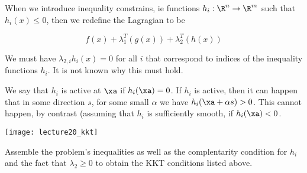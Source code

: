 \documentclass[../main.tex]{subfiles}
\begin{document}
\begin{definition}
    When we introduce inequality constrains, ie functions $h_i: \R^n \to \R^m$ such that $h_i(x) \leq 0$, then we redefine the Lagragian to be

    \[
        f(x) + \lambda_1^T(g(x)) + \lambda_2^T(h(x))
    \]
\end{definition}

\begin{remark}
    We must have $\lambda_{2,i} h_{i}(x) = 0$ for all $i$ that correspond to indices of the inequality functions $h_i$. It is not known why this must hold.

We say that $h_i$ is active at $\xa$ if $h_i(\xa) = 0$. If $h_i$ is active, then it can happen that in some direction $s$, for some small $\alpha$ we have $h_i(\xa + \alpha s) > 0$. This cannot happen, by contrast (assuming that $h_i$ is sufficiently smooth, if $h_i(\xa) < 0$.
\end{remark}

\begin{center}
    \texttt{[image: lecture20\_kkt]}
\end{center}

Assemble the problem's inequalities as well as the complentarity condition for $h_i$ and the fact that $\lambda_2 \geq 0$ to obtain the KKT conditions listed above.
\end{document}
